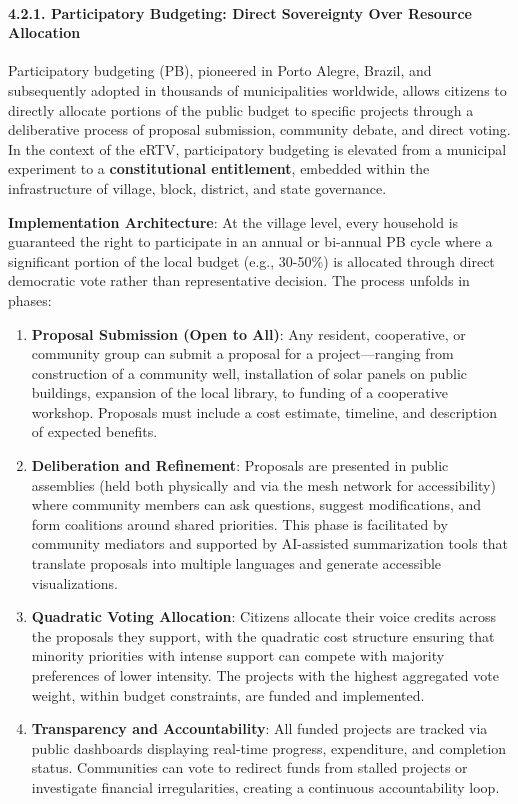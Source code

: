\paragraph{4.2.1. Participatory Budgeting: Direct Sovereignty Over
Resource
Allocation}\label{participatory-budgeting-direct-sovereignty-over-resource-allocation}

Participatory budgeting (PB), pioneered in Porto Alegre, Brazil, and
subsequently adopted in thousands of municipalities worldwide, allows
citizens to directly allocate portions of the public budget to specific
projects through a deliberative process of proposal submission,
community debate, and direct voting. In the context of the eRTV,
participatory budgeting is elevated from a municipal experiment to a
\textbf{constitutional entitlement}, embedded within the infrastructure
of village, block, district, and state governance.

\textbf{Implementation Architecture}: At the village level, every
household is guaranteed the right to participate in an annual or
bi-annual PB cycle where a significant portion of the local budget
(e.g., 30-50\%) is allocated through direct democratic vote rather than
representative decision. The process unfolds in phases:

\begin{enumerate}
\def\labelenumi{\arabic{enumi}.}
\item
  \textbf{Proposal Submission (Open to All)}: Any resident, cooperative,
  or community group can submit a proposal for a project---ranging from
  construction of a community well, installation of solar panels on
  public buildings, expansion of the local library, to funding of a
  cooperative workshop. Proposals must include a cost estimate,
  timeline, and description of expected benefits.
\item
  \textbf{Deliberation and Refinement}: Proposals are presented in
  public assemblies (held both physically and via the mesh network for
  accessibility) where community members can ask questions, suggest
  modifications, and form coalitions around shared priorities. This
  phase is facilitated by community mediators and supported by
  AI-assisted summarization tools that translate proposals into multiple
  languages and generate accessible visualizations.
\item
  \textbf{Quadratic Voting Allocation}: Citizens allocate their voice
  credits across the proposals they support, with the quadratic cost
  structure ensuring that minority priorities with intense support can
  compete with majority preferences of lower intensity. The projects
  with the highest aggregated vote weight, within budget constraints,
  are funded and implemented.
\item
  \textbf{Transparency and Accountability}: All funded projects are
  tracked via public dashboards displaying real-time progress,
  expenditure, and completion status. Communities can vote to redirect
  funds from stalled projects or investigate financial irregularities,
  creating a continuous accountability loop.
\end{enumerate}

